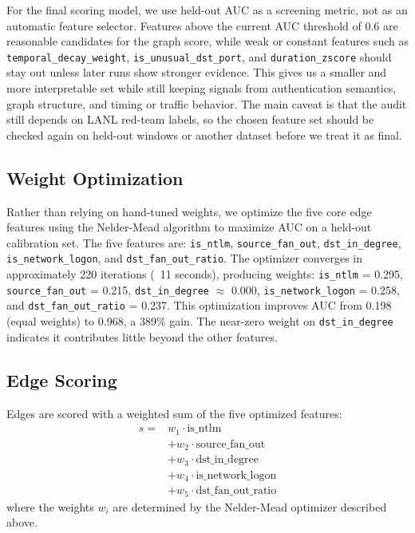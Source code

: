 \documentclass[letterpaper,twocolumn,10pt]{article}
\begin{document}
For the final scoring model, we use held-out AUC as a screening metric, not as an automatic feature selector. Features above the current AUC threshold of 0.6 are reasonable candidates for the graph score, while weak or constant features such as \texttt{temporal\_decay\_weight}, \texttt{is\_unusual\_dst\_port}, and \texttt{duration\_zscore} should stay out unless later runs show stronger evidence. This gives us a smaller and more interpretable set while still keeping signals from authentication semantics, graph structure, and timing or traffic behavior. The main caveat is that the audit still depends on LANL red-team labels, so the chosen feature set should be checked again on held-out windows or another dataset before we treat it as final.

\subsection{Weight Optimization}

Rather than relying on hand-tuned weights, we optimize the five core edge features using the Nelder-Mead algorithm to maximize AUC on a held-out calibration set. The five features are: \texttt{is\_ntlm}, \texttt{source\_fan\_out}, \texttt{dst\_in\_degree}, \texttt{is\_network\_logon}, and \texttt{dst\_fan\_out\_ratio}. The optimizer converges in approximately 220 iterations (~11 seconds), producing weights: \texttt{is\_ntlm} = 0.295, \texttt{source\_fan\_out} = 0.215, \texttt{dst\_in\_degree} $\approx$ 0.000, \texttt{is\_network\_logon} = 0.258, and \texttt{dst\_fan\_out\_ratio} = 0.237. This optimization improves AUC from 0.198 (equal weights) to 0.968, a 389\% gain. The near-zero weight on \texttt{dst\_in\_degree} indicates it contributes little beyond the other features.

\subsection{Edge Scoring}

Edges are scored with a weighted sum of the five optimized features:
\begin{equation}
\begin{aligned}
s ={}& w_1 \cdot \text{is\_ntlm} \\
    &+ w_2 \cdot \text{source\_fan\_out} \\
    &+ w_3 \cdot \text{dst\_in\_degree} \\
    &+ w_4 \cdot \text{is\_network\_logon} \\
    &+ w_5 \cdot \text{dst\_fan\_out\_ratio}
\end{aligned}
\end{equation}
where the weights $w_i$ are determined by the Nelder-Mead optimizer described above.
\end{document}
